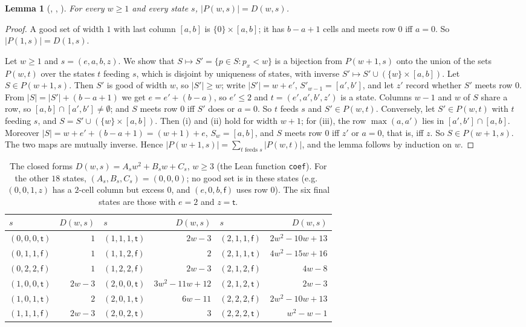 \documentclass[11pt]{amsart}
\theoremstyle{plain}
\newtheorem{lemma}[theorem]{Lemma}
\theoremstyle{definition}
\newcommand{\code}[1]{\texttt{#1}}
\newcommand{\tru}{\mathsf{t}}
\newcommand{\fls}{\mathsf{f}}
\begin{document}
\begin{lemma}[, , ]\label{lem:transfer}
For every $w\ge1$ and every state $s$, $|P(w,s)|=D(w,s)$.
\end{lemma}

\begin{proof}
A good set of width $1$ with last column $[a,b]$ is $\{0\}\times[a,b]$; it has $b-a+1$ cells and meets row $0$ iff $a=0$. So $|P(1,s)|=D(1,s)$.

Let $w\ge1$ and $s=(e,a,b,z)$. We show that $S\mapsto S'=\{p\in S:p_x<w\}$ is a bijection from $P(w+1,s)$ onto the union of the sets $P(w,t)$ over the states $t$ feeding $s$, which is disjoint by uniqueness of states, with inverse $S'\mapsto S'\cup(\{w\}\times[a,b])$. Let $S\in P(w+1,s)$. Then $S'$ is good of width $w$, so $|S'|\ge w$; write $|S'|=w+e'$, $S'_{w-1}=[a',b']$, and let $z'$ record whether $S'$ meets row $0$. From $|S|=|S'|+(b-a+1)$ we get $e=e'+(b-a)$, so $e'\le2$ and $t=(e',a',b',z')$ is a state. Columns $w-1$ and $w$ of $S$ share a row, so $[a,b]\cap[a',b']\neq\emptyset$; and $S$ meets row $0$ iff $S'$ does or $a=0$. So $t$ feeds $s$ and $S'\in P(w,t)$. Conversely, let $S'\in P(w,t)$ with $t$ feeding $s$, and $S=S'\cup(\{w\}\times[a,b])$. Then (i) and (ii) hold for width $w+1$; for (iii), the row $\max(a,a')$ lies in $[a',b']\cap[a,b]$. Moreover $|S|=w+e'+(b-a+1)=(w+1)+e$, $S_w=[a,b]$, and $S$ meets row $0$ iff $z'$ or $a=0$, that is, iff $z$. So $S\in P(w+1,s)$. The two maps are mutually inverse. Hence $|P(w+1,s)|=\sum_{t\text{ feeds }s}|P(w,t)|$, and the lemma follows by induction on $w$.
\end{proof}

\begin{table}[t]
\centering\small
\begin{tabular}{@{}lr@{\qquad}lr@{\qquad}lr@{}}
\toprule
$s$ & $D(w,s)$ & $s$ & $D(w,s)$ & $s$ & $D(w,s)$\\
\midrule
$(0,0,0,\tru)$ & $1$ & $(1,1,1,\tru)$ & $2w-3$ & $(2,1,1,\fls)$ & $2w^2-10w+13$\\
$(0,1,1,\fls)$ & $1$ & $(1,1,2,\fls)$ & $2$ & $(2,1,1,\tru)$ & $4w^2-15w+16$\\
$(0,2,2,\fls)$ & $1$ & $(1,2,2,\fls)$ & $2w-3$ & $(2,1,2,\fls)$ & $4w-8$\\
$(1,0,0,\tru)$ & $2w-3$ & $(2,0,0,\tru)$ & $3w^2-11w+12$ & $(2,1,2,\tru)$ & $2w-3$\\
$(1,0,1,\tru)$ & $2$ & $(2,0,1,\tru)$ & $6w-11$ & $(2,2,2,\fls)$ & $2w^2-10w+13$\\
$(1,1,1,\fls)$ & $2w-3$ & $(2,0,2,\tru)$ & $3$ & $(2,2,2,\tru)$ & $w^2-w-1$\\
\bottomrule
\end{tabular}
\medskip
\caption{The closed forms $D(w,s)=A_sw^2+B_sw+C_s$, $w\ge3$ (the Lean function \code{coef}). For the other $18$ states, $(A_s,B_s,C_s)=(0,0,0)$; no good set is in these states (e.g.\ $(0,0,1,z)$ has a $2$-cell column but excess $0$, and $(e,0,b,\fls)$ uses row $0$). The six final states are those with $e=2$ and $z=\tru$.}
\label{tab:coef}
\end{table}
\end{document}
